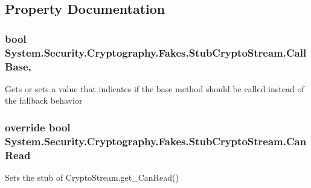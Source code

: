 \subsection{Property Documentation}
\hypertarget{class_system_1_1_security_1_1_cryptography_1_1_fakes_1_1_stub_crypto_stream_a8b70e0dc6d435aadc6b20940d06ebe8e}{
\subsubsection[{Call\-Base}]{\setlength{\rightskip}{0pt plus 5cm}bool System.\-Security.\-Cryptography.\-Fakes.\-Stub\-Crypto\-Stream.\-Call\-Base\hspace{0.3cm}{\ttfamily [get]}, {\ttfamily [set]}}}\label{class_system_1_1_security_1_1_cryptography_1_1_fakes_1_1_stub_crypto_stream_a8b70e0dc6d435aadc6b20940d06ebe8e}


Gets or sets a value that indicates if the base method should be called instead of the fallback behavior

\hypertarget{class_system_1_1_security_1_1_cryptography_1_1_fakes_1_1_stub_crypto_stream_a14c24180a3a6fa93515ead554dc5bffb}{
\subsubsection[{Can\-Read}]{\setlength{\rightskip}{0pt plus 5cm}override bool System.\-Security.\-Cryptography.\-Fakes.\-Stub\-Crypto\-Stream.\-Can\-Read\hspace{0.3cm}{\ttfamily [get]}}}\label{class_system_1_1_security_1_1_cryptography_1_1_fakes_1_1_stub_crypto_stream_a14c24180a3a6fa93515ead554dc5bffb}


Sets the stub of Crypto\-Stream.\-get\-\_\-\-Can\-Read()

